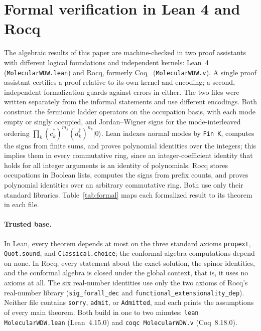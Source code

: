 \documentclass[reprint,aps,prd,amsmath,amssymb,superscriptaddress,nofootinbib,floatfix]{revtex4-2}
\theoremstyle{plain}
\theoremstyle{definition}
\theoremstyle{remark}
\newcommand{\ket}[1]{\ensuremath{|#1\rangle}}
\begin{document}
\section{Formal verification in Lean 4 and Rocq}
\label{sec:lean}

The algebraic results of this paper are machine-checked in two proof assistants with different logical
foundations and independent kernels: Lean~4~\cite{Lean4} (\texttt{MolecularWDW.lean}) and Rocq, formerly
Coq~\cite{Rocq} (\texttt{MolecularWDW.v}). A single proof assistant certifies a proof relative to its own kernel and
encoding; a second, independent formalization guards against errors in either. The two files were written
separately from the informal statements and use different encodings. Both construct the fermionic ladder
operators on the occupation basis, with each mode empty or singly occupied, and Jordan--Wigner signs for the
mode-interleaved ordering $\prod_k(c_k^\dagger)^{m_k}(d_k^\dagger)^{n_k}\ket0$. Lean indexes normal modes by \texttt{Fin K},
computes the signs from finite sums, and proves polynomial identities over the integers; this implies them in every
commutative ring, since an integer-coefficient identity that holds for all integer arguments is an identity of
polynomials. Rocq stores occupations in Boolean lists, computes the signs from prefix counts, and proves polynomial
identities over an arbitrary commutative ring.
Both use only their standard libraries. Table~\ref{tab:formal} maps each formalized result to its theorem in each
file.

\paragraph*{Trusted base.} In Lean, every theorem depends at most on the three standard axioms
\texttt{propext}, \texttt{Quot.sound}, and \texttt{Classical.choice}; the conformal-algebra computations depend on
none. In Rocq, every statement about the exact solution, the spinor identities, and the conformal algebra is
closed under the global context, that is, it uses no axioms at all. The six real-number identities use only
the two axioms of Rocq's real-number library (\texttt{sig\_forall\_dec} and \texttt{functional\_extensionality\_dep}).
Neither file contains \texttt{sorry}, \texttt{admit}, or \texttt{Admitted}, and each prints the assumptions of every main
theorem. Both build in one to two minutes: \texttt{lean MolecularWDW.lean} (Lean~4.15.0) and \texttt{coqc
MolecularWDW.v} (Coq~8.18.0).
\end{document}
